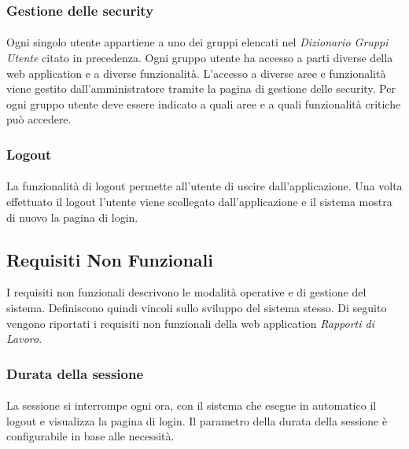   \subsubsection{Gestione delle security}
  \paragraph{}
  Ogni singolo utente appartiene a uno dei gruppi elencati nel \textit{Dizionario Gruppi Utente} citato in precedenza. 
  Ogni gruppo utente ha accesso a parti diverse della web application e a diverse funzionalità. L'accesso a diverse aree e 
  funzionalità viene gestito dall'amministratore tramite la pagina di gestione delle security. Per ogni gruppo utente 
  deve essere indicato a quali aree e a quali funzionalità critiche può accedere.



  \subsubsection{Logout}
  \paragraph{}
  La funzionalità di logout permette all’utente di uscire dall’applicazione. Una volta effettuato il 
  logout l’utente viene scollegato dall’applicazione e il sistema mostra di nuovo la pagina di login.



  \subsection{Requisiti Non Funzionali}
  I requisiti non funzionali descrivono le modalità operative e di gestione del sistema. Definiscono quindi vincoli 
  sullo sviluppo del sistema stesso. Di seguito vengono riportati i requisiti non funzionali della web application \textit{Rapporti di Lavoro}.
  
  \subsubsection{Durata della sessione}
  \paragraph{}
  La sessione si interrompe ogni ora, con il sistema che esegue in automatico il logout e visualizza 
  la pagina di login. Il parametro della durata della sessione è configurabile in base alle necessità.


